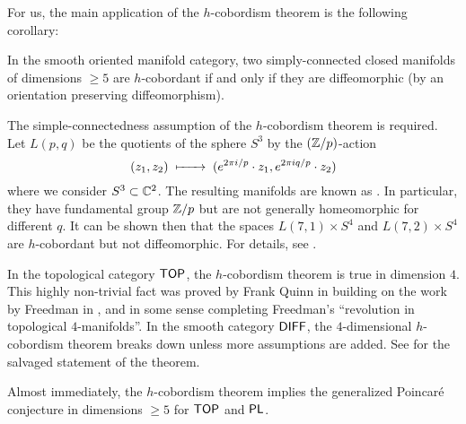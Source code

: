 For us, the main application of the $h$-cobordism theorem is the following corollary:

\begin{corollary}\label{thm:h-cobordism-diffeomorphism}
	In the smooth oriented manifold category, two simply-connected closed manifolds of dimensions $\geq 5$ are $h$-cobordant if and only if they are diffeomorphic (by an orientation preserving diffeomorphism).
\end{corollary}

\begin{remark*}
	The simple-connectedness assumption of the $h$-cobordism theorem is required. Let $L(p,q)$ be the quotients of the sphere $S^3$ by the $(\mathbb{Z}/p)$-action 
	\[
		(z_1,z_2) \lkxmapsto (e^{2\pi i/p}\cdot z_1, e^{2\pi i q/p}\cdot z_2)
	\]
	where we consider $S^3\subset \mathbb{C}^2$. The resulting manifolds are known as .  In particular, they have fundamental group $\mathbb{Z}/p$ but are not generally homeomorphic for different $q$. It can be shown then that the spaces $L(7,1)\times S^4$ and $L(7,2)\times S^4$ are $h$-cobordant but not diffeomorphic. For details, see \cite{counterexamples2022}.
\end{remark*}

\begin{remark*}
	In the topological category $\mathsf{TOP}$, the $h$-cobordism theorem is true in dimension $4$. This highly non-trivial fact was proved by Frank Quinn in \cite{quinn1982} building on the work by Freedman in \cite{freedman1982manifold}, and in some sense completing Freedman's ``revolution in topological $4$-manifolds''. In the smooth category $\mathsf{DIFF}$, the $4$-dimensional $h$-cobordism theorem breaks down unless more assumptions are added. See \cite{cfhs1996hcobordism} for the salvaged statement of the theorem.
\end{remark*}

Almost immediately, the $h$-cobordism theorem implies the generalized Poincar\'e conjecture in dimensions $\geq 5$ for $\mathsf{TOP}$ and $\mathsf{PL}$. 

